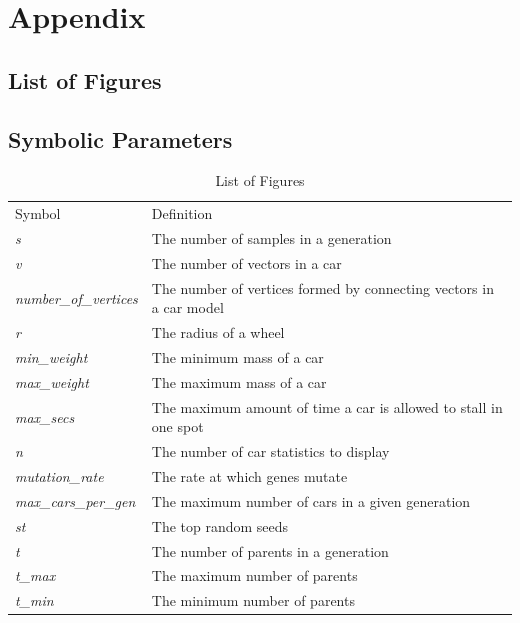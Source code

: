 \documentclass[12pt, titlepage]{article}
\begin{document}
\newpage

\section{Appendix}


\subsection{List of Figures}

\subsection{Symbolic Parameters}

\begin{table}[h!]
\centering
\label{LOF}
\begin{tabular}{ll}
Symbol & Definition \\
\textit{s} & The number of samples in a generation  \\
\textit{v} & The number of vectors in a car  \\
\textit{number\_of\_vertices} & The number of vertices formed by connecting 
vectors in a car model \\
\textit{r} & The radius of a wheel\\
\textit{min\_weight} & The minimum mass of a car\\
\textit{max\_weight} & The maximum mass of a car\\
\textit{max\_secs} & The maximum amount of time a car is allowed to stall in one 
spot\\
\textit{n} & The number of car statistics to display\\
\textit{mutation\_rate} & The rate at which genes mutate\\
\textit{max\_cars\_per\_gen} & The maximum number of cars in a given 
generation\\
\textit{st} & The top random seeds \\
\textit{t} & The number of parents in a generation\\
\textit{t\_max} & The maximum number of parents\\
\textit{t\_min} & The minimum number of parents\\
\end{tabular}
\caption{List of Figures}
\end{table}
\end{document}
